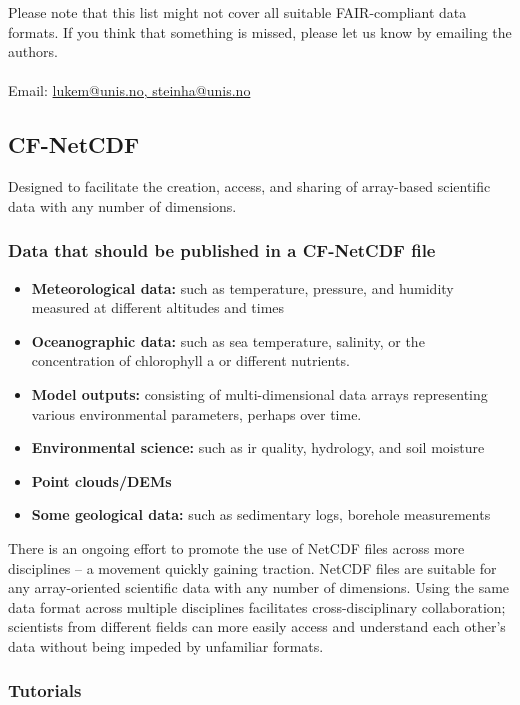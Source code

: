 \documentclass[a4paper,12pt]{article}
\makeatletter
\newcommand{\emailauthors}{\href{mailto:lukem@unis.no,steinha@unis.no}{lukem@unis.no, steinha@unis.no}}
\makeatother
\begin{document}
Please note that this list might not cover all suitable FAIR-compliant data formats. If you think that something is missed, please let us know by emailing the authors.\\ \\
Email: \emailauthors 

\subsection{CF-NetCDF}

Designed to facilitate the creation, access, and sharing of array-based scientific data with any number of dimensions.

\subsubsection{Data that should be published in a CF-NetCDF file}
\begin{itemize}
\item \textbf{Meteorological data:} such as temperature, pressure, and humidity measured at different altitudes and times
\item \textbf{Oceanographic data:} such as sea temperature, salinity, or the concentration of chlorophyll a or different nutrients.
\item \textbf{Model outputs:} consisting of multi-dimensional data arrays representing various environmental parameters, perhaps over time.
\item \textbf{Environmental science:} such as ir quality, hydrology, and soil moisture
\item \textbf{Point clouds/DEMs}
\item \textbf{Some geological data:} such as sedimentary logs, borehole measurements
\end{itemize}

There is an ongoing effort to promote the use of NetCDF files across more disciplines – a movement quickly gaining traction. NetCDF files are suitable for any array-oriented scientific data with any number of dimensions. Using the same data format across multiple disciplines facilitates cross-disciplinary collaboration; scientists from different fields can more easily access and understand each other’s data without being impeded by unfamiliar formats.

\subsubsection{Tutorials}
\end{document}
